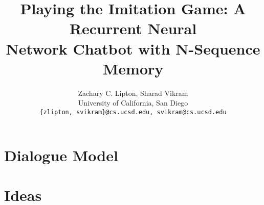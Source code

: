 \documentclass[]{article}
\begin{document}
\title{Playing the Imitation Game:  A Recurrent Neural \\
 Network Chatbot with N-Sequence Memory}

\author{Zachary C. Lipton, Sharad Vikram\\
University of California, San Diego\\
\texttt{\{zlipton, svikram\}@cs.ucsd.edu, svikram@cs.ucsd.edu}
}

\begin{abstract}

\end{abstract}

\section{Dialogue Model}

\section{Ideas}
\end{document}
